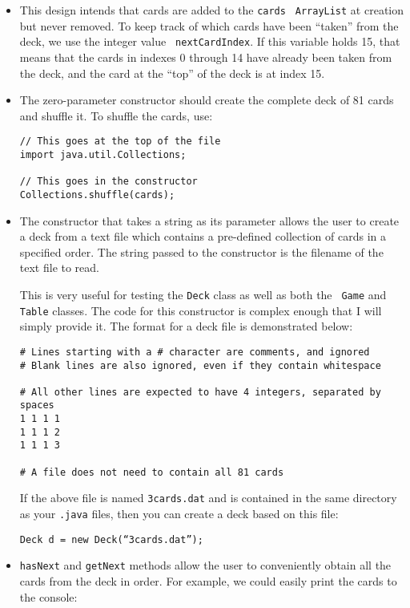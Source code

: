 \documentclass[11pt]{article}
\begin{document}
\begin{itemize}
\item This design intends that cards are added to the {\tt cards} {\tt
    ArrayList} at creation but never removed.  To keep track of which cards
  have been ``taken'' from the deck, we use the integer value {\tt
    nextCardIndex}.  If this variable holds 15, that means that the cards in
  indexes 0 through 14 have already been taken from the deck, and the card at
  the ``top'' of the deck is at index 15.

\item The zero-parameter constructor should create the complete deck of 81
  cards and shuffle it.  To shuffle the cards, use:

{\footnotesize
\begin{verbatim} 
// This goes at the top of the file
import java.util.Collections;

// This goes in the constructor
Collections.shuffle(cards);
\end{verbatim}}

\item The constructor that takes a string as its parameter allows the user to
  create a deck from a text file which contains a pre-defined collection of
  cards in a specified order. The string passed to the constructor is the
  filename of the text file to read.

  This is very useful for testing the {\tt Deck} class as well as both the {\tt
    Game} and {\tt Table} classes.  The code for this constructor is complex
  enough that I will simply provide it.  The format for a deck file is
  demonstrated below:

\newpage 
{\footnotesize
\begin{verbatim}
# Lines starting with a # character are comments, and ignored
# Blank lines are also ignored, even if they contain whitespace
   
# All other lines are expected to have 4 integers, separated by spaces
1 1 1 1
1 1 1 2
1 1 1 3

# A file does not need to contain all 81 cards
\end{verbatim}}

  If the above file is named {\tt 3cards.dat} and is contained in the same
  directory as your {\tt .java} files, then you can create a deck based on this
  file:

{\footnotesize\tt Deck d = new Deck(``3cards.dat'');}

\item {\tt hasNext} and {\tt getNext} methods allow the user to conveniently
  obtain all the cards from the deck in order.  For example, we could easily
  print the cards to the console:


\end{itemize}
\end{document}
